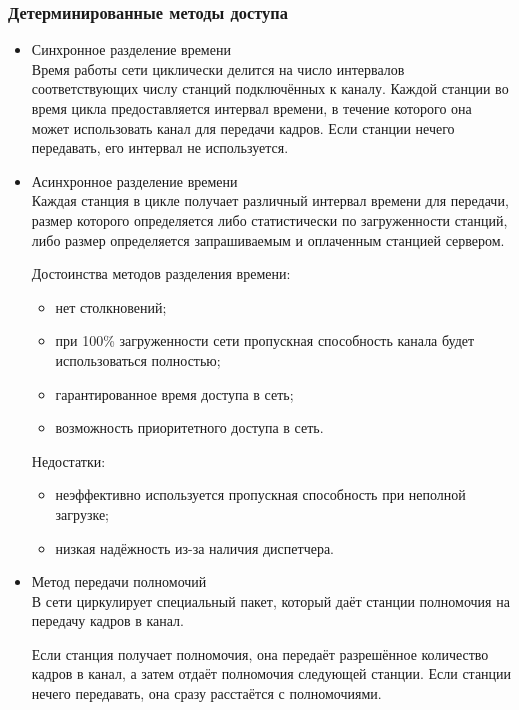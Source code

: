 \documentclass[12pt, russian, oneside, article]{ncc}
\begin{document}
\subsubsection{Детерминированные методы доступа}
\label{sec-5_1_2}
\begin{itemize}

\item Синхронное разделение времени\\
\label{sec-5_1_2_1}%
Время работы сети циклически делится на число интервалов соответствующих числу станций подключённых к каналу. Каждой станции во время цикла предоставляется интервал времени, в течение которого она может использовать канал для передачи кадров. Если станции нечего передавать, его интервал не используется.


\item Асинхронное разделение времени\\
\label{sec-5_1_2_2}%
Каждая станция в цикле получает различный интервал времени для передачи, размер которого определяется либо статистически по загруженности станций, либо размер определяется запрашиваемым и оплаченным станцией сервером.

Достоинства методов разделения времени:
\begin{itemize}
\item нет столкновений;
\item при 100\% загруженности сети пропускная способность канала будет использоваться полностью;
\item гарантированное время доступа в сеть;
\item возможность приоритетного доступа в сеть.
\end{itemize}

Недостатки:
\begin{itemize}
\item неэффективно используется пропускная способность при неполной загрузке;
\item низкая надёжность из-за наличия диспетчера.
\end{itemize}


\item Метод передачи полномочий\\
\label{sec-5_1_2_3}%
В сети циркулирует специальный пакет, который даёт станции полномочия на передачу кадров в канал.

Если станция получает полномочия, она передаёт разрешённое количество кадров в канал, а затем отдаёт полномочия следующей станции. Если станции нечего передавать, она сразу расстаётся с полномочиями.


\end{itemize}
\end{document}
